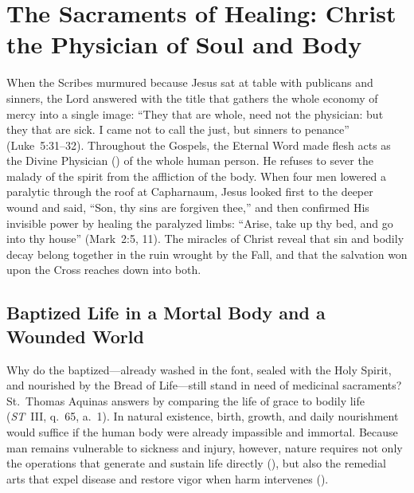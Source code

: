 \section{The Sacraments of Healing: Christ the Physician of Soul and Body}
\label{sec:healing-introduction}

When the Scribes murmured because Jesus sat at table with publicans and sinners, the Lord answered with the title that gathers the whole economy of mercy into a single image: ``They that are whole, need not the physician: but they that are sick. I came not to call the just, but sinners to penance'' (Luke~5:31--32). Throughout the Gospels, the Eternal Word made flesh acts as the Divine Physician () of the whole human person. He refuses to sever the malady of the spirit from the affliction of the body. When four men lowered a paralytic through the roof at Capharnaum, Jesus looked first to the deeper wound and said, ``Son, thy sins are forgiven thee,'' and then confirmed His invisible power by healing the paralyzed limbs: ``Arise, take up thy bed, and go into thy house'' (Mark~2:5, 11). The miracles of Christ reveal that sin and bodily decay belong together in the ruin wrought by the Fall, and that the salvation won upon the Cross reaches down into both.

\subsection{Baptized Life in a Mortal Body and a Wounded World}
\label{subsec:baptized-life-wounded-world}

Why do the baptized---already washed in the font, sealed with the Holy Spirit, and nourished by the Bread of Life---still stand in need of medicinal sacraments? St.~Thomas Aquinas answers by comparing the life of grace to bodily life (\emph{ST}~III, q.~65, a.~1). In natural existence, birth, growth, and daily nourishment would suffice if the human body were already impassible and immortal. Because man remains vulnerable to sickness and injury, however, nature requires not only the operations that generate and sustain life directly (), but also the remedial arts that expel disease and restore vigor when harm intervenes ().

